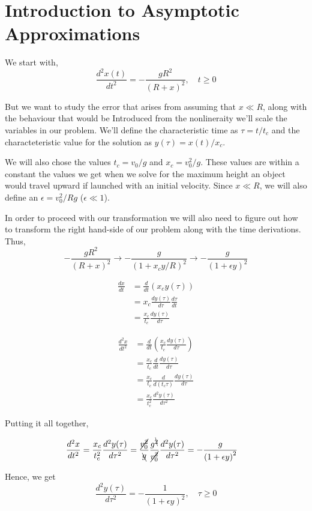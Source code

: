 \section{Introduction to Asymptotic Approximations}

We start with,
$$
\frac{d^2 x(t)}{dt^2} = - \frac{g R^2}{\left(R + x\right)^2}, \quad t \geq 0
$$

But we want to study the error that arises from assuming that $x \ll R$, along with the
behaviour that would be Introduced from the nonlineraity we'll scale the variables in our problem.
We'll define the characteristic time as $\tau = t / t_c$ and
the characteteristic value for the solution as $y(\tau) = x(t) / x_c$.

We will also chose the values $t_c = v_0 / g$ and $x_c = v_{0}^{2} / g$.
These values are within a constant the values we get when we solve for the maximum height an object
would travel upward if launched with an initial velocity.
Since $x \ll R$, we will also define an $\epsilon = v_{0}^2 / Rg$ ($\epsilon \ll 1$).

In order to proceed with our transformation we will also need to figure out how to transform the right hand-side of our problem
along with the time derivations.
Thus,
$$
- \frac{g R^2}{\left(R + x\right)^2} \rightarrow
- \frac{g}{\left(1  + x_c y/R\right)^2} \rightarrow
- \frac{g}{\left(1  + \epsilon y\right)^2}
$$

\begin{align*}
\frac{dx}{dt} &= \frac{d}{dt} \left( x_c y(\tau) \right) \\
&= x_c \frac{d y(\tau)}{d\tau} \frac{d \tau}{dt} \\
&= \frac{x_c}{t_c} \frac{d y(\tau)}{d\tau}
\end{align*}

\begin{align*}
\frac{d^2 x}{dt^2} &= \frac{d}{dt} \left( \frac{x_c}{t_c} \frac{d y(\tau)}{d\tau} \right) \\
&=  \frac{x_c}{t_c} \frac{d}{dt} \frac{d y(\tau)}{d\tau} \\
&= \frac{x_c}{t_c} \frac{d}{d (t_c \tau)} \frac{d y(\tau)}{d\tau} \\
&= \frac{x_c}{t_{c}^2} \frac{d^2 y(\tau)}{d\tau^2} 
\end{align*}

Putting it all together,

\begin{align*}
\frac{d^2 x}{dt^2} &= \frac{x_c}{t_{c}^2} \frac{d^2 y(\tau)}{d\tau^2}
= \frac{\cancel{v_{0}^2}}{\bcancel{g}} \frac{g^{\bcancel{2}}}{\cancel{v_{0}^2}} \frac{d^2 y(\tau)}{d\tau^2}
= - \frac{g}{\left(1  + \epsilon y\right)^2}
\end{align*}

Hence, we get
$$
\frac{d^2 y(\tau)}{d\tau^2} = - \frac{1}{\left(1  + \epsilon y\right)^2}, \quad \tau \geq 0
$$